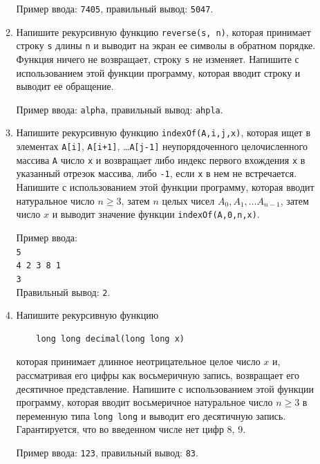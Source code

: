 \documentclass{article}
\newcommand{\textex}[1]{\texttt{\color{ForestGreen}#1}}
\begin{document}
\begin{enumerate}[label={}, leftmargin=0pt, itemindent=0pt]
\begin{enumerate}[label=\arabic{enumi}.\arabic*.]
\noindent Пример ввода: \textex{7405}, правильный вывод: \textex{5047}.
\item
Напишите рекурсивную функцию \texttt{reverse(s, n)}, которая принимает строку \texttt{s} длины \texttt{n} и выводит на экран ее символы в обратном порядке. Функция ничего не возвращает, строку \texttt{s} не изменяет. Напишите с использованием этой функции программу, которая вводит строку и выводит ее обращение.

\noindent Пример ввода: \textex{alpha}, правильный вывод: \textex{ahpla}.

\item
Напишите рекурсивную функцию \texttt{indexOf(A,i,j,x)}, которая ищет в элементах \texttt{A[i]}, \texttt{A[i+1]}, \ldots \texttt{A[j-1]} неупорядоченного целочисленного массива \texttt{A} число \texttt{x} и возвращает либо индекс первого вхождения \texttt{x} в указанный отрезок массива, либо \texttt{-1}, если \texttt{x} в нем не встречается. Напишите с использованием этой функции программу, которая вводит натуральное число $n\geqslant 3$, затем $n$ целых чисел $A_0, A_1, \ldots A_{n-1}$, затем число $x$ и выводит значение функции \texttt{indexOf(A,0,n,x)}.

\noindent Пример ввода: \\
\textex{5\\4 2 3 8 1\\3}
\\
Правильный вывод: \textex{2}.

\item
Напишите рекурсивную функцию 
\begin{verbatim}
    long long decimal(long long x)
\end{verbatim}
которая принимает длинное неотрицательное целое число $x$ и, рассматривая его цифры как восьмеричную запись, возвращает его десятичное представление. Напишите с использованием этой функции программу, которая вводит восьмеричное натуральное число $n\geqslant 3$ в переменную типа \texttt{long long} и выводит его десятичную запись. Гарантируется, что во введенном числе нет цифр 8, 9.

\noindent Пример ввода: \textex{123}, правильный вывод: \textex{83}.
\end{enumerate}

\end{enumerate}
\end{document}
